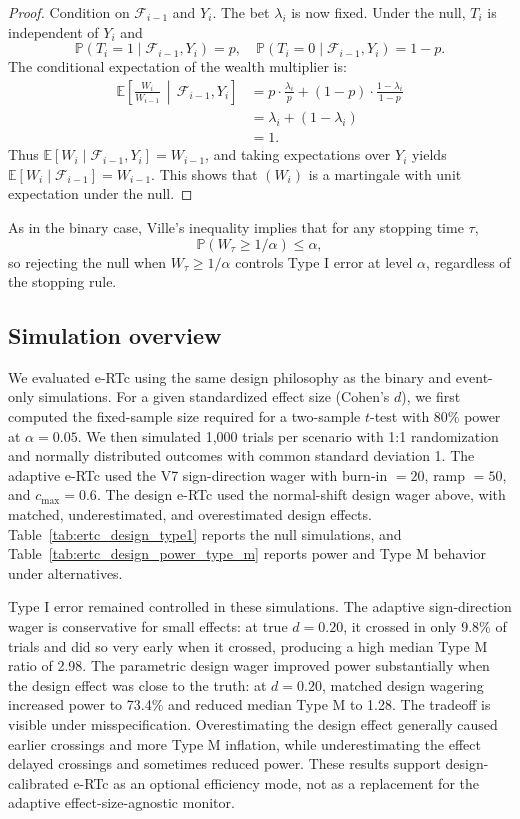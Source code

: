 \documentclass[10pt]{article}
\begin{document}
\begin{proof}
Condition on $\mathcal{F}_{i-1}$ and $Y_i$. The bet $\lambda_i$ is now fixed. Under the null, $T_i$ is independent of $Y_i$ and
\[
\mathbb{P}(T_i = 1 \mid \mathcal{F}_{i-1}, Y_i) = p, \quad
\mathbb{P}(T_i = 0 \mid \mathcal{F}_{i-1}, Y_i) = 1-p.
\]
The conditional expectation of the wealth multiplier is:
\begin{align}
\mathbb{E}\!\left[\frac{W_i}{W_{i-1}} \,\middle|\, \mathcal{F}_{i-1}, Y_i\right]
&= p \cdot \frac{\lambda_i}{p} + (1-p) \cdot \frac{1 - \lambda_i}{1-p} \\
&= \lambda_i + (1 - \lambda_i) \\
&= 1.
\end{align}
Thus $\mathbb{E}[W_i \mid \mathcal{F}_{i-1}, Y_i] = W_{i-1}$, and taking expectations over $Y_i$ yields $\mathbb{E}[W_i \mid \mathcal{F}_{i-1}] = W_{i-1}$. This shows that $(W_i)$ is a martingale with unit expectation under the null.
\end{proof}

As in the binary case, Ville's inequality implies that for any stopping time $\tau$,
\[
\mathbb{P}(W_\tau \geq 1/\alpha) \leq \alpha,
\]
so rejecting the null when $W_\tau \geq 1/\alpha$ controls Type I error at level $\alpha$, regardless of the stopping rule.

\subsection{Simulation overview}

We evaluated e-RTc using the same design philosophy as the binary and event-only simulations. For a given standardized effect size (Cohen's $d$), we first computed the fixed-sample size required for a two-sample $t$-test with 80\% power at $\alpha = 0.05$. We then simulated 1{,}000 trials per scenario with 1:1 randomization and normally distributed outcomes with common standard deviation 1. The adaptive e-RTc used the V7 sign-direction wager with burn-in $=20$, ramp $=50$, and $c_{\max}=0.6$. The design e-RTc used the normal-shift design wager above, with matched, underestimated, and overestimated design effects. Table~\ref{tab:ertc_design_type1} reports the null simulations, and Table~\ref{tab:ertc_design_power_type_m} reports power and Type M behavior under alternatives.



Type I error remained controlled in these simulations. The adaptive sign-direction wager is conservative for small effects: at true $d=0.20$, it crossed in only 9.8\% of trials and did so very early when it crossed, producing a high median Type M ratio of 2.98. The parametric design wager improved power substantially when the design effect was close to the truth: at $d=0.20$, matched design wagering increased power to 73.4\% and reduced median Type M to 1.28. The tradeoff is visible under misspecification. Overestimating the design effect generally caused earlier crossings and more Type M inflation, while underestimating the effect delayed crossings and sometimes reduced power. These results support design-calibrated e-RTc as an optional efficiency mode, not as a replacement for the adaptive effect-size-agnostic monitor.
\end{document}
